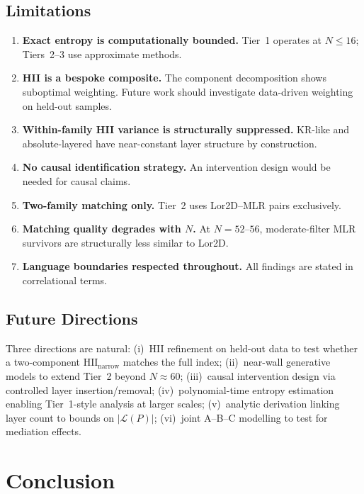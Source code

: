 \documentclass[entropy,article,submit,pdftex,moreauthors]{Definitions/mdpi}
\begin{document}
\subsection{Limitations}

\begin{enumerate}[nosep]
    \item \textbf{Exact entropy is computationally bounded.} Tier~1 operates at $N \leq 16$; Tiers~2--3 use approximate methods.
    \item \textbf{HII is a bespoke composite.} The component decomposition shows suboptimal weighting. Future work should investigate data-driven weighting on held-out samples.
    \item \textbf{Within-family HII variance is structurally suppressed.} KR-like and absolute-layered have near-constant layer structure by construction.
    \item \textbf{No causal identification strategy.} An intervention design would be needed for causal claims.
    \item \textbf{Two-family matching only.} Tier~2 uses Lor2D--MLR pairs exclusively.
    \item \textbf{Matching quality degrades with $N$.} At $N = 52$--$56$, moderate-filter MLR survivors are structurally less similar to Lor2D.
    \item \textbf{Language boundaries respected throughout.} All findings are stated in correlational terms.
\end{enumerate}

\subsection{Future Directions}

Three directions are natural: (i)~HII refinement on held-out data to test whether a two-component $\text{HII}_\text{narrow}$ matches the full index; (ii)~near-wall generative models to extend Tier~2 beyond $N \approx 60$; (iii)~causal intervention design via controlled layer insertion/removal; (iv)~polynomial-time entropy estimation enabling Tier~1-style analysis at larger scales; (v)~analytic derivation linking layer count to bounds on $|\mathcal{L}(P)|$; (vi)~joint A--B--C modelling to test for mediation effects.

\section{Conclusion}
\end{document}

